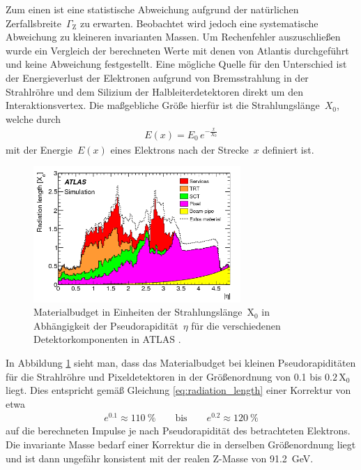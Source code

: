 \documentclass[11pt, a4paper]{article}
\numberwithin{equation}{section}
\begin{document}
Zum einen ist eine statistische Abweichung aufgrund der natürlichen Zerfallsbreite~$\Gamma_\mathrm{Z}$ zu erwarten.
Beobachtet wird jedoch eine systematische Abweichung zu kleineren invarianten Massen.
Um Rechenfehler auszuschließen wurde ein Vergleich der berechneten Werte mit denen von Atlantis durchgeführt und keine Abweichung festgestellt.
Eine mögliche Quelle für den Unterschied ist der Energieverlust der Elektronen aufgrund von Bremsstrahlung in der Strahlröhre und dem Silizium der Halbleiterdetektoren direkt um den Interaktionsvertex.
Die maßgebliche Größe hierfür ist die Strahlungslänge~$X_0$, welche durch
\begin{align}
	E(x) = E_0 \, e^{-\frac{x}{X_0}}
	\label{eq:radiation_length}
\end{align}
mit der Energie~$E(x)$ eines Elektrons nach der Strecke~$x$ definiert ist.
\begin{figure}
	\centering
	\includegraphics[width=0.7\textwidth]{./figures/invariant_mass_zee/material_budget.png}
	\caption{Materialbudget in Einheiten der Strahlungslänge~$\mathrm{X}_0$ in Abhängigkeit der Pseudorapidität~$\eta$ für die verschiedenen Detektorkomponenten in ATLAS \cite{electron_atlas}.} 
	\label{fig:material_budget}
\end{figure}
In Abbildung \ref{fig:material_budget} sieht man, dass das Materialbudget bei kleinen Pseudorapiditäten für die Strahlröhre und Pixeldetektoren in der Größenordnung von \num{0.1} bis $\num{0.2} \, \mathrm{X}_0$ liegt.
Dies entspricht gemäß Gleichung \eqref{eq:radiation_length} einer Korrektur von etwa
\begin{align*}
	e^{\num{0.1}} \approx \SI{110}{\percent} \qquad \text{bis} \qquad e^{\num{0.2}} \approx \SI{120}{\percent}
\end{align*}
auf die berechneten Impulse je nach Pseudorapidität des betrachteten Elektrons.
Die invariante Masse bedarf einer Korrektur die in derselben Größenordnung liegt und ist dann ungefähr konsistent mit der realen Z-Masse von \SI{91.2}{\GeV}.
\end{document}
